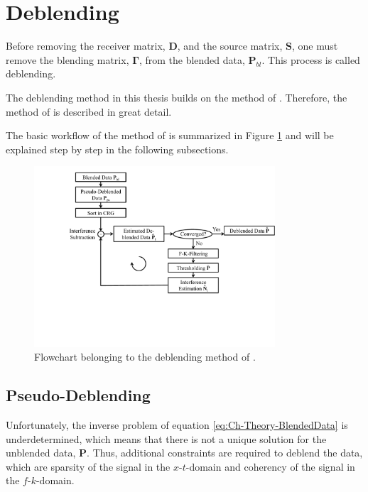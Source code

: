 \section{Deblending} \label{sec:MahdadMethod}

Before removing the receiver matrix, $\mathbf{D}$, and the source matrix, $\mathbf{S}$, one must remove  the blending matrix, $\mathbf{\Gamma}$, from the blended data, $\mathbf{P}_{bl}$. This process is called deblending.

The deblending method in this thesis builds on the method of \citet{Mahdad-Deblending-Method}. Therefore, the method of \citet{Mahdad-Deblending-Method} is described in great detail.

The basic workflow of the method of \citet{Mahdad-Deblending-Method} is summarized in Figure \ref{fig:Ch-Theory-FlowChart} and will be explained step by step in the following subsections. 

\begin{figure}
	\centering
	\includegraphics[width=0.8\textwidth]{Plots/Mahdad-FlowChart-v4}
	\caption{Flowchart belonging to the deblending method of \citet{Mahdad-Deblending-Method}.}
	\label{fig:Ch-Theory-FlowChart}
\end{figure}

\subsection{Pseudo-Deblending}

Unfortunately, the inverse problem of equation \ref{eq:Ch-Theory-BlendedData} is underdetermined, which means that there is not a unique solution for the unblended data, $\mathbf{P}$. Thus, additional constraints are required to deblend the data, which are sparsity of the signal in the $x$-$t$-domain and coherency of the signal in the $f$-$k$-domain. 

